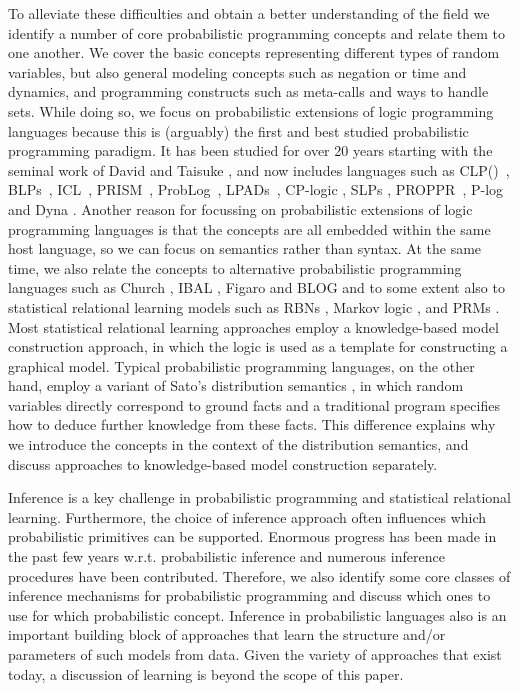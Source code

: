 \documentclass[a4paper]{article}
\newcommand{\clpbn}
  {CLP()}
\begin{document}
To alleviate these difficulties and obtain a better understanding of the field
we identify a number of core probabilistic programming concepts and
relate them to one another. We cover the basic
concepts representing different types of random variables, but also
general modeling concepts such as negation or time and dynamics, and
programming constructs such as meta-calls and ways to handle sets. 
While doing so, we focus on probabilistic extensions of logic programming languages
because this is (arguably) the first and best studied probabilistic programming paradigm. 
It has been studied for over 20 years starting with the seminal work of David \cite{Poole92} and Taisuke \cite{Sato:95},
and now includes languages such as  \clpbn~\citep{clpbn},
BLPs~\citep{Kersting08}, ICL~\citep{Poole08},
PRISM~\citep{SatoKameya:01}, ProbLog~\citep{DeRaedt07-IJCAIa},
LPADs~\citep{Vennekens04}, 
CP-logic \citep{vennekens:tplp09},  SLPs \citep{Muggleton:96},
PROPPR~\citep{wang:cikm13}, P-log \citep{baral:tplp09} and Dyna \citep{Eisner05}. 
Another reason for focussing on probabilistic extensions of logic programming languages
is that the concepts are all embedded within the same host language, so we can focus on semantics rather than syntax. 
At the same time, we also relate the concepts to alternative
probabilistic programming languages such as Church \citep{Goodman08},
IBAL \citep{Pfeffer01}, Figaro \citep{Pfeffer09} and BLOG \citep{Milch05}
and to some extent also to statistical relational learning models such
as RBNs \citep{Jaeger08}, Markov logic \citep{Richardson:06},
 and PRMs \citep{getoor}.  Most statistical relational learning approaches
employ a knowledge-based model construction approach, in which the
logic is used as a template
for constructing a graphical model. Typical probabilistic programming
languages, on the other hand, employ a variant of Sato's distribution semantics \citep{Sato:95}, in which 
random variables directly correspond to ground facts and a traditional program 
specifies how to deduce further knowledge from these facts. This
difference explains
why we introduce the concepts in the context of the distribution semantics,
and discuss approaches to knowledge-based model construction separately.

Inference is a key challenge in probabilistic programming and
statistical relational learning.  
Furthermore, the choice of inference approach often influences which
probabilistic primitives can be supported. 
Enormous progress has been made in the past few years w.r.t. probabilistic inference and numerous inference procedures have been contributed. 
Therefore, we also identify some core classes of inference mechanisms for probabilistic programming and discuss which 
ones to use for which probabilistic concept. Inference in probabilistic languages also
is an important building block of approaches that learn the structure
and/or parameters of such models from data. Given the variety of
approaches that exist today, a discussion of learning is beyond the
scope of this paper. 
\end{document}
